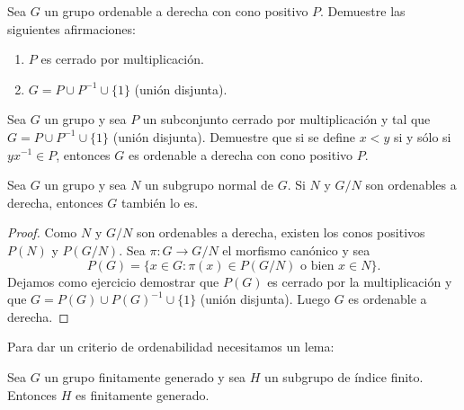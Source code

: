 \begin{exercise}
	Sea $G$ un grupo ordenable a derecha con cono positivo $P$. Demuestre las
	siguientes afirmaciones:
	\begin{enumerate}
		\item $P$ es cerrado por multiplicación.
		\item $G=P\cup P^{-1}\cup \{1\}$ (unión disjunta).
	\end{enumerate}
\end{exercise}

\begin{exercise}
	Sea $G$ un grupo y sea $P$ un subconjunto cerrado por multiplicación y tal
	que $G=P\cup P^{-1}\cup \{1\}$ (unión disjunta). Demuestre que si se define $x<y$ si y
	sólo si $yx^{-1}\in P$, entonces $G$ es ordenable a derecha con cono
	positivo $P$.
\end{exercise}

\begin{lemma}
	Sea $G$ un grupo y sea $N$ un subgrupo normal de $G$.  Si $N$ y $G/N$ son
	ordenables a derecha, entonces $G$ también lo es. 
\end{lemma}
%
\begin{proof}
	Como $N$ y $G/N$ son ordenables a derecha, existen los conos positivos
	$P(N)$ y $P(G/N)$. Sea $\pi\colon G\to G/N$ el morfismo canónico y sea
	\[
		P(G)=\{x\in G:\pi(x)\in P(G/N)\text{ o bien }x\in N\}.
	\]	
	Dejamos como ejercicio demostrar que $P(G)$ es cerrado por la
	multiplicación y que $G=P(G)\cup P(G)^{-1}\cup \{1\}$ (unión disjunta).
	Luego $G$ es ordenable a derecha. 
\end{proof}
%

Para dar un criterio de ordenabilidad necesitamos un lema:

\begin{lemma}
	\label{lemma:fg}
	Sea $G$ un grupo finitamente generado y sea $H$ un subgrupo de índice
	finito. Entonces $H$ es finitamente generado.
\end{lemma}

